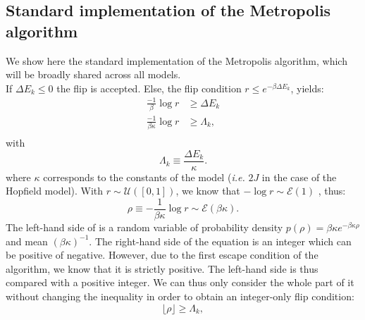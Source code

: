 \subsection{Standard implementation of the Metropolis algorithm}
\myindent We show here the standard implementation of the Metropolis algorithm, which will be broadly shared across all models.\\
If $\Delta E_k \leq 0$ the flip is accepted. Else, the flip condition $r \leq e^{-\beta \Delta E_k}$, yields:
\begin{equation}
\begin{aligned}
  \frac{-1}{\beta}\log r &\geq \Delta E_k\\
  \frac{-1}{\beta \kappa}\log r &\geq \Lambda_k,\\
\end{aligned}
\label{eq:flip_condition}
\end{equation}
with
\begin{equation}
  \Lambda_k \equiv \frac{\Delta E_k}{\kappa}.
  \label{eq:def_lambda}
\end{equation}
where  $\kappa$ corresponds to the constants of the model (\textit{i.e.} $2J$ in the case of the Hopfield model).
With $r \sim \mathcal{U}([0,1])$, we know that $-\log r \sim \mathcal{E}(1)$ , thus:
\begin{equation}
   \rho \equiv -\frac{1}{\beta \kappa}\log r  \sim \mathcal{E}(\beta \kappa).
\end{equation}
 The left-hand side of  is a random variable of probability density $p(\rho)=\beta  \kappa e^{-\beta  \kappa \rho}$ and mean $(\beta  \kappa)^{-1}$.
The right-hand side of the equation is an integer which can be positive of negative. However, due to the first escape condition of the algorithm, we know that it is strictly positive. The left-hand side is thus compared with a positive integer. We can thus only consider the whole part of it without changing the inequality in order to obtain an integer-only flip condition:
\begin{equation}
  \lfloor \rho \rfloor \geq \Lambda_k,
  \label{eq:flip_int}
\end{equation}

